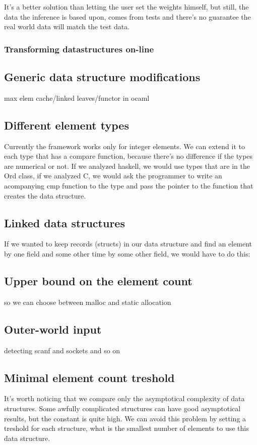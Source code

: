 \documentclass[11pt]{article}
\begin{document}
			It's a better solution than letting the user set the weights himself, but still, the data the inference is based upon, comes from tests
			and there's no guarantee the real world data will match the test data.

		\subsubsection{Transforming datastructures on-line}
	\subsection{Generic data structure modifications}

		max elem cache/linked leaves/functor in ocaml
	\subsection{Different element types}
		Currently the framework works only for integer elements. We can extend it to each type that has a compare function, because there's no
		difference if the types are numerical or not.  If we analyzed haskell, we would use types that are in the Ord class, if we analyzed C, we would
		ask the programmer to write an acompanying cmp function to the type and pass the pointer to the function that creates the data structure.
	\subsection{Linked data structures}
		If we wanted to keep records (structs) in our data structure and find an element by one field and some other time by some other field, we would
		have to do this:
	\subsection{Upper bound on the element count}
		so we can choose between malloc and static allocation
	\subsection{Outer-world input}
		detecting scanf and sockets and so on
	\subsection{Minimal element count treshold}
		It's worth noticing that we compare only the asymptotical complexity of data structures. Some awfully complicated structures can have good
		asymptotical results, but the constant is quite high. We can avoid this problem by setting a treshold for each structure, what is the smallest
		number of elements to use this data structure.
\end{document}
